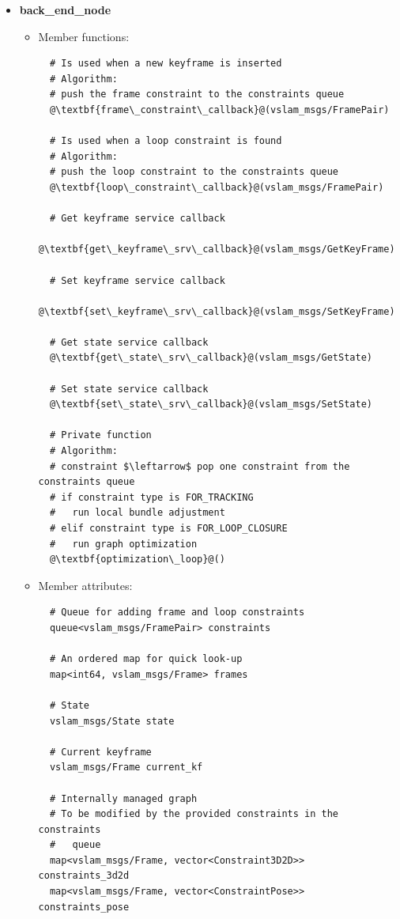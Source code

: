 \begin{itemize}
\begin{itemize}
\begin{lstlisting}
  # Add keyframe to database service callback
  @\textbf{add\_keyframe\_srv\_callback}@(vslam_msgs/AddKeyFrameToDB)
\end{lstlisting}

    \item Member attributes:
\begin{lstlisting}

\end{lstlisting} 
  \end{itemize} 
  \item \textbf{back\_end\_node}
  \begin{itemize}
    \item Member functions:
\begin{lstlisting}
  # Is used when a new keyframe is inserted
  # Algorithm:
  # push the frame constraint to the constraints queue
  @\textbf{frame\_constraint\_callback}@(vslam_msgs/FramePair)

  # Is used when a loop constraint is found
  # Algorithm:
  # push the loop constraint to the constraints queue
  @\textbf{loop\_constraint\_callback}@(vslam_msgs/FramePair)

  # Get keyframe service callback
  @\textbf{get\_keyframe\_srv\_callback}@(vslam_msgs/GetKeyFrame)

  # Set keyframe service callback
  @\textbf{set\_keyframe\_srv\_callback}@(vslam_msgs/SetKeyFrame)

  # Get state service callback
  @\textbf{get\_state\_srv\_callback}@(vslam_msgs/GetState)

  # Set state service callback
  @\textbf{set\_state\_srv\_callback}@(vslam_msgs/SetState)

  # Private function
  # Algorithm:
  # constraint $\leftarrow$ pop one constraint from the constraints queue
  # if constraint type is FOR_TRACKING
  #   run local bundle adjustment
  # elif constraint type is FOR_LOOP_CLOSURE
  #   run graph optimization
  @\textbf{optimization\_loop}@()
\end{lstlisting}

    \item Member attributes:
\begin{lstlisting}
  # Queue for adding frame and loop constraints
  queue<vslam_msgs/FramePair> constraints

  # An ordered map for quick look-up
  map<int64, vslam_msgs/Frame> frames

  # State
  vslam_msgs/State state
  
  # Current keyframe
  vslam_msgs/Frame current_kf

  # Internally managed graph
  # To be modified by the provided constraints in the constraints 
  #   queue
  map<vslam_msgs/Frame, vector<Constraint3D2D>> constraints_3d2d 
  map<vslam_msgs/Frame, vector<ConstraintPose>> constraints_pose
\end{lstlisting}
  \end{itemize} 
\end{itemize}

